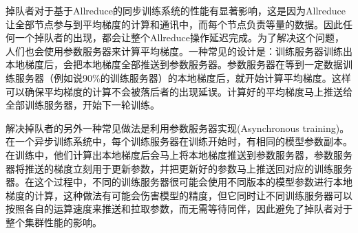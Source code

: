 \documentclass[letterpaper,10pt,english]{sphinxmanual}
\begin{document}
\sphinxAtStartPar
掉队者对于基于Allreduce的同步训练系统的性能有显著影响，这是因为Allreduce让全部节点参与到平均梯度的计算和通讯中，而每个节点负责等量的数据。因此任何一个掉队者的出现，都会让整个Allreduce操作延迟完成。为了解决这个问题，人们也会使用参数服务器来计算平均梯度。一种常见的设计是：训练服务器训练出本地梯度后，会把本地梯度全部推送到参数服务器。参数服务器在等到一定数据训练服务器（例如说90\%的训练服务器）的本地梯度后，就开始计算平均梯度。这样可以确保平均梯度的计算不会被落后者的出现延误。计算好的平均梯度马上推送给全部训练服务器，开始下一轮训练。

\sphinxAtStartPar
解决掉队者的另外一种常见做法是利用参数服务器实现(Asynchronous
training)。在一个异步训练系统中，每个训练服务器在训练开始时，有相同的模型参数副本。在训练中，他们计算出本地梯度后会马上将本地梯度推送到参数服务器，参数服务器将推送的梯度立刻用于更新参数，并把更新好的参数马上推送回对应的训练服务器。在这个过程中，不同的训练服务器很可能会使用不同版本的模型参数进行本地梯度的计算，这种做法有可能会伤害模型的精度，但它同时让不同训练服务器可以按照各自的运算速度来推送和拉取参数，而无需等待同伴，因此避免了掉队者对于整个集群性能的影响。
\end{document}
